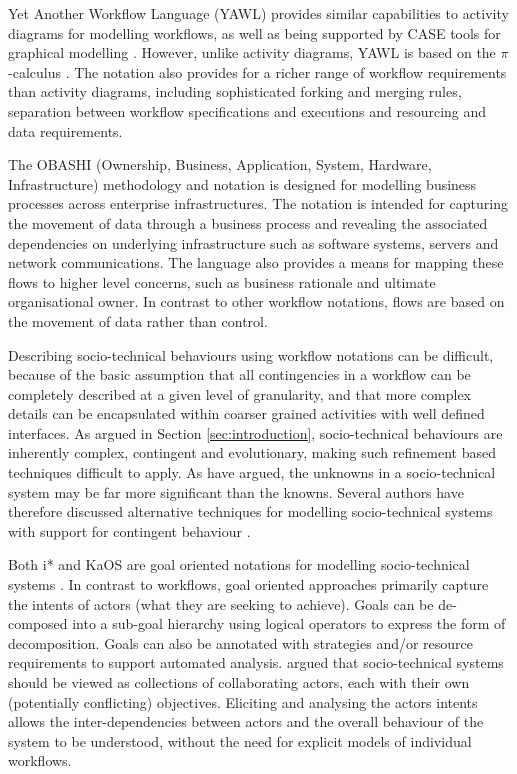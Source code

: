 \documentclass{sig-alternate}
\newcommand{\picalc}{\(\pi\)-calculus }
\begin{document}
Yet Another Workflow Language (YAWL) provides similar capabilities to activity
diagrams for modelling workflows, as well as being supported by CASE tools for
graphical modelling \citep{hofstede2010yawl}.  However, unlike activity diagrams,
YAWL is based on the \picalc\citep{Aalst2004}.  The notation also provides for a
richer range of workflow requirements than activity diagrams, including
sophisticated forking and merging rules, separation between workflow
specifications and executions and resourcing and data requirements.

The OBASHI (Ownership, Business, Application, System, Hardware, Infrastructure)
methodology and notation \citep{obashimethodology} is designed for modelling
business processes across enterprise infrastructures.  The notation is intended
for capturing the movement of data through a business process and revealing the
associated dependencies on underlying infrastructure such as software systems,
servers and network communications.  The language also provides a means for
mapping these flows to higher level concerns, such as business rationale and
ultimate organisational owner. In contrast to other workflow notations, flows
are based on the movement of data rather than control.


Describing socio-technical behaviours using workflow notations can be difficult,
because of the basic assumption that all contingencies in a workflow can be
completely described at a given level of granularity, and that more complex
details can be encapsulated within coarser grained activities with well defined
interfaces.  As argued in Section \ref{sec:introduction}, socio-technical
behaviours are inherently complex, contingent and evolutionary, making such
refinement based techniques difficult to apply.  As
\citet{israilidis13ignorance} have argued, the unknowns in a socio-technical
system may be far more significant than the knowns. Several authors have
therefore discussed alternative techniques for modelling socio-technical systems
with support for contingent behaviour
\citep{yu1995,dardenne93goal,Herrmann1999,sommerville09deriving}.

Both i*\citet{yu1995} and KaOS \citet{dardenne93goal} are goal oriented
notations for modelling socio-technical systems \citep{Werneck2009}.  In
contrast to workflows, goal oriented approaches primarily capture the intents of
actors (what they are seeking to achieve).  Goals can be de-composed into a
sub-goal hierarchy using logical operators to express the form of
decomposition. Goals can also be annotated with strategies and/or resource
requirements to support automated analysis.  \citeauthor{yu1995} argued that
socio-technical systems should be viewed as collections of collaborating actors,
each with their own (potentially conflicting) objectives.  Eliciting and
analysing the actors intents allows the inter-dependencies between actors and
the overall behaviour of the system to be understood, without the need for
explicit models of individual workflows.
\end{document}
